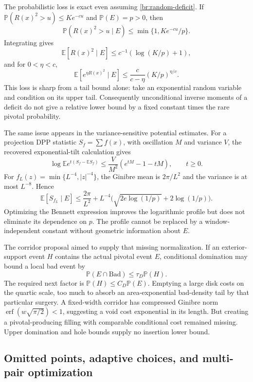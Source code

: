 \documentclass[11pt,a4paper]{article}
\theoremstyle{definition}
\theoremstyle{remark}
\numberwithin{equation}{section}
\begin{document}
The probabilistic loss is exact even assuming
\eqref{br:random-deficit}.  If
$\mathbb P(R(x)^2>u)\leq Ke^{-cu}$ and $\mathbb P(E)=p>0$, then
\[
 \mathbb P(R(x)^2>u\mid E)
 \leq\min\{1,Ke^{-cu}/p\}.
\]
Integrating gives
\[
 \mathbb E[R(x)^2\mid E]\leq c^{-1}(\log(K/p)+1),
\]
and for $0<\eta<c$,
\[
 \mathbb E[e^{\eta R(x)^2}\mid E]
 \leq\frac c{c-\eta}(K/p)^{\eta/c}.
\]
This loss is sharp from a tail bound alone: take an exponential random
variable and condition on its upper tail.  Consequently unconditional
inverse moments of a deficit do not give a relative lower bound by
a fixed constant times the rare pivotal probability.

The same issue appears in the variance-sensitive potential estimates.
For a projection DPP statistic $S_f=\sum f(x)$, with oscillation $M$
and variance $V$, the recovered exponential-tilt calculation gives
\[
 \log\mathbb E e^{t(S_f-\mathbb ES_f)}
 \leq\frac V{M^2}(e^{tM}-1-tM),\qquad t\geq0.
\]
For $f_L(z)=\min\{L^{-4},|z|^{-4}\}$, the Ginibre mean is
$2\pi/L^2$ and the variance is at most $L^{-8}$.  Hence
\[
 \mathbb E[S_{f_L}\mid E]
 \leq\frac{2\pi}{L^2}
  +L^{-4}\bigl(\sqrt{2e\log(1/p)}+2\log(1/p)\bigr).
\]
Optimizing the Bennett expression improves the logarithmic profile
but does not eliminate its dependence on $p$.  The profile cannot
be replaced by a window-independent constant without geometric
information about $E$.

The corridor proposal aimed to supply that missing normalization.
If an exterior-support event $H$ contains the actual pivotal event
$E$, conditional domination may bound a local bad event by
\[
 \mathbb P(E\cap\mathrm{Bad})\leq\tau_D\mathbb P(H).
\]
The required next factor is $\mathbb P(H)\leq C_D\mathbb P(E)$.
Emptying a large disk costs on the quartic scale, too much to absorb
an area-exponential bad-density tail by that particular surgery.
A fixed-width corridor has compressed Ginibre norm
$\operatorname{erf}(w\sqrt{\pi/2})<1$, suggesting a void cost
exponential in its length.  But creating a pivotal-producing filling
with comparable conditional cost remained missing.  Upper domination
and hole bounds supply no insertion lower bound.

\subsection{Omitted points, adaptive choices, and multi-pair optimization}
\label{br:multipair}
\end{document}
